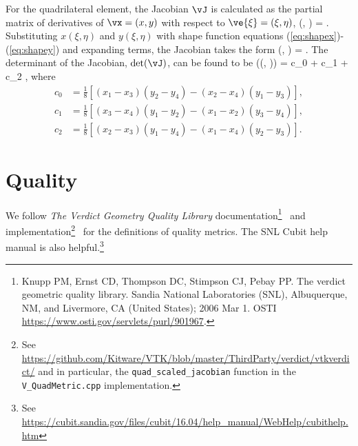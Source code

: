 \documentclass[14pt,letterpaper,fleqn]{extreport}
\begin{document}
For the quadrilateral element, the Jacobian $\vJ$ is calculated as 
the partial matrix of derivatives of $\vx = (x, y)$ with 
respect to $\ve{\xi} = (\xi, \eta)$, 
\be 
 \vJ(\xi, \eta)  
 \left[
  \frac{\partial \vx}{\partial \ve{\xi}}
 \right]
 = 
 .
\ee 
Substituting $x(\xi, \eta)$ and $y(\xi, \eta)$ with shape function equations
(\ref{eq:shapex})-(\ref{eq:shapey}) and expanding terms,  the Jacobian takes 
the form 
\be 
 \vJ(\xi, \eta) =  
  \left[ 
  \begin{tabular}{cc}
    $x_1$ & $y_1$ \\
    $x_2$ & $y_2$ \\
    $x_3$ & $y_3$ \\
    $x_4$ & $y_4$ \\
  \end{tabular}
  \right].
\ee 
The determinant of the Jacobian, $\det(\vJ)$, can be found to be 
\be 
\det(\vJ\left(\xi, \eta)\right) = c_0 + c_1 \xi + c_2 \eta,
\ee 
where
\begin{align}
  c_0 & = \frac{1}{8} \left[(x_1 - x_3) (y_2 - y_4) - (x_2 - x_4) (y_1 - y_3) \right], \\
  c_1 & = \frac{1}{8} \left[(x_3 - x_4) (y_1 - y_2) - (x_1 - x_2) (y_3 - y_4) \right], \\
  c_2 & = \frac{1}{8} \left[(x_2 - x_3) (y_1 - y_4) - (x_1 - x_4) (y_2 - y_3) \right].
\end{align}

\clearpage

\section{Quality}

We follow {\em The Verdict Geometry Quality Library} 
documentation\footnote{Knupp PM, Ernst CD, Thompson DC, Stimpson CJ, Pebay PP. 
The verdict geometric quality library. Sandia National Laboratories (SNL), 
Albuquerque, NM, and Livermore, CA (United States); 2006 Mar 1.  
OSTI \href{link}{https://www.osti.gov/servlets/purl/901967}.}~%
and 
implementation\footnote{See
\href{link}{https://github.com/Kitware/VTK/blob/master/ThirdParty/verdict/vtkverdict/}
and in particular, the {\tt quad\_scaled\_jacobian} function in the {\tt V\_QuadMetric.cpp} implementation.}~%
for the definitions of
quality metrics.  
The SNL Cubit help manual is also helpful.\footnote{See \href{link}{https://cubit.sandia.gov/files/cubit/16.04/help\_manual/WebHelp/cubithelp.htm}
}~%
\end{document}

